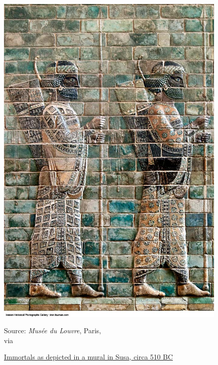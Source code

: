 \documentclass[twoside, a4paper, 12pt]{article}
\newcommand{\sourceL}[1]{\caption*{Source: {#1}\hfill} }
\begin{document}
\begin{figure}
  \centering
  \includegraphics[width=\linewidth]{ImmortalsSusa.jpg}
  \captionsetup{justification=raggedright}
  \caption{\ul{Immortals as depicted in a mural in Susa, circa 510 BC}}
  \sourceL{\emph{Mus\'ee du Louvre}, Paris, \\ via \cite{iranian_historical_photography}}
  \label{img:ImmortalSusa}
\end{figure}
\end{document}

